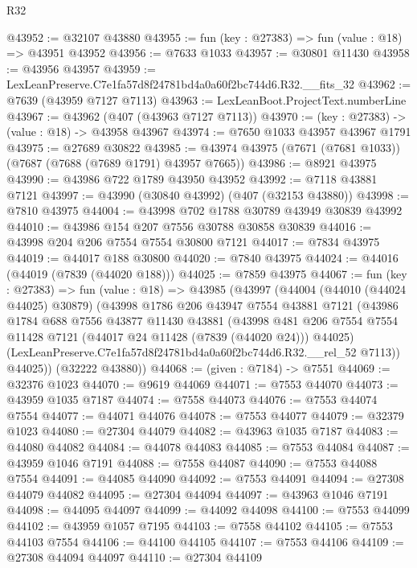 \begin{lexlean}{R32}
\begin{coremodule}
@43952 := @32107 @43880
@43955 := fun (key : @27383) => fun (value : @18) => @43951 @43952
@43956 := @7633 @1033
@43957 := @30801 @11430
@43958 := @43956 @43957
@43959 := LexLeanPreserve.C7e1fa57d8f24781bd4a0a60f2bc744d6.R32.__fits_32
@43962 := @7639 (@43959 @7127 @7113)
@43963 := LexLeanBoot.ProjectText.numberLine
@43967 := @43962 (@407 (@43963 @7127 @7113))
@43970 := (key : @27383) -> (value : @18) -> @43958 @43967
@43974 := @7650 @1033 @43957 @43967 @1791
@43975 := @27689 @30822
@43985 := @43974 @43975 (@7671 (@7681 @1033)) (@7687 (@7688 (@7689 @1791) @43957 @7665))
@43986 := @8921 @43975
@43990 := @43986 @722 @1789 @43950 @43952
@43992 := @7118 @43881 @7121
@43997 := @43990 (@30840 @43992) (@407 (@32153 @43880))
@43998 := @7810 @43975
@44004 := @43998 @702 @1788 @30789 @43949 @30839 @43992
@44010 := @43986 @154 @207 @7556 @30788 @30858 @30839
@44016 := @43998 @204 @206 @7554 @7554 @30800 @7121
@44017 := @7834 @43975
@44019 := @44017 @188 @30800
@44020 := @7840 @43975
@44024 := @44016 (@44019 (@7839 (@44020 @188)))
@44025 := @7859 @43975
@44067 := fun (key : @27383) =>
  fun (value : @18) =>
  @43985
    (@43997
      (@44004
        (@44010 (@44024 @44025) @30879)
        (@43998
          @1786
          @206
          @43947
          @7554
          @43881
          @7121
          (@43986
            @1784
            @688
            @7556
            @43877
            @11430
            @43881
            (@43998
              @481
              @206
              @7554
              @7554
              @11428
              @7121
              (@44017 @24 @11428 (@7839 (@44020 @24)))
              @44025)
            (LexLeanPreserve.C7e1fa57d8f24781bd4a0a60f2bc744d6.R32.__rel_52 @7113))
          @44025))
      (@32222 @43880))
@44068 := (given : @7184) -> @7551
@44069 := @32376 @1023
@44070 := @9619 @44069
@44071 := @7553 @44070
@44073 := @43959 @1035 @7187
@44074 := @7558 @44073
@44076 := @7553 @44074 @7554
@44077 := @44071 @44076
@44078 := @7553 @44077
@44079 := @32379 @1023
@44080 := @27304 @44079
@44082 := @43963 @1035 @7187
@44083 := @44080 @44082
@44084 := @44078 @44083
@44085 := @7553 @44084
@44087 := @43959 @1046 @7191
@44088 := @7558 @44087
@44090 := @7553 @44088 @7554
@44091 := @44085 @44090
@44092 := @7553 @44091
@44094 := @27308 @44079 @44082
@44095 := @27304 @44094
@44097 := @43963 @1046 @7191
@44098 := @44095 @44097
@44099 := @44092 @44098
@44100 := @7553 @44099
@44102 := @43959 @1057 @7195
@44103 := @7558 @44102
@44105 := @7553 @44103 @7554
@44106 := @44100 @44105
@44107 := @7553 @44106
@44109 := @27308 @44094 @44097
@44110 := @27304 @44109

\end{coremodule}
\end{lexlean}

